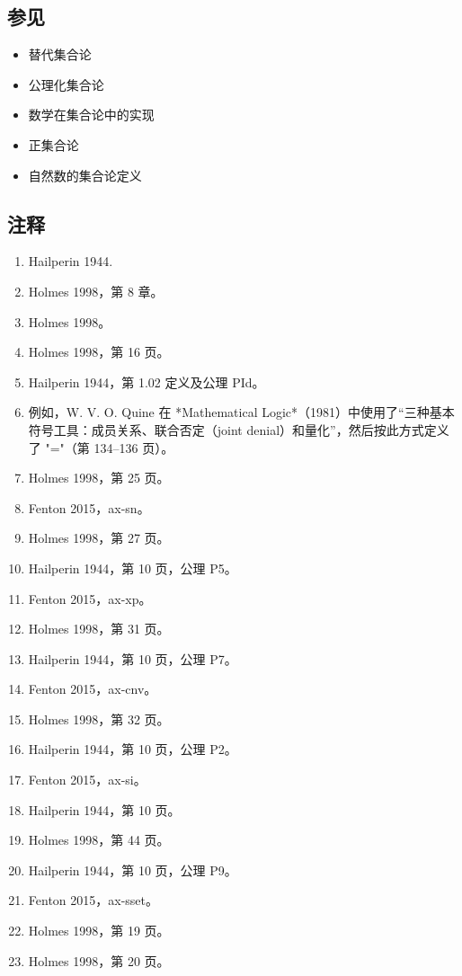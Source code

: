 \subsection{参见}  
\begin{itemize}
\item 替代集合论
\item 公理化集合论 
\item 数学在集合论中的实现 
\item 正集合论  
\item 自然数的集合论定义
\end{itemize}
\subsection{注释}  
\begin{enumerate}
\item Hailperin 1944.  
\item Holmes 1998，第 8 章。  
\item Holmes 1998。  
\item Holmes 1998，第 16 页。  
\item Hailperin 1944，第 1.02 定义及公理 PId。  
\item 例如，W. V. O. Quine 在 *Mathematical Logic*（1981）中使用了“三种基本符号工具：成员关系、联合否定（joint denial）和量化”，然后按此方式定义了 "="（第 134–136 页）。  
\item Holmes 1998，第 25 页。  
\item Fenton 2015，ax-sn。  
\item Holmes 1998，第 27 页。  
\item Hailperin 1944，第 10 页，公理 P5。  
\item Fenton 2015，ax-xp。  
\item Holmes 1998，第 31 页。  
\item Hailperin 1944，第 10 页，公理 P7。  
\item Fenton 2015，ax-cnv。  
\item Holmes 1998，第 32 页。  
\item Hailperin 1944，第 10 页，公理 P2。  
\item Fenton 2015，ax-si。  
\item Hailperin 1944，第 10 页。  
\item Holmes 1998，第 44 页。  
\item Hailperin 1944，第 10 页，公理 P9。  
\item Fenton 2015，ax-sset。  
\item Holmes 1998，第 19 页。  
\item Holmes 1998，第 20 页。  

\end{enumerate}

